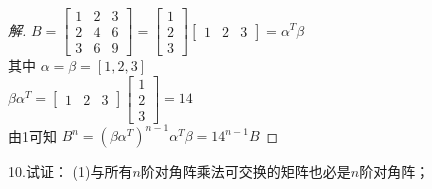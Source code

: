 \documentclass[10pt,a4paper]{report}
\begin{document}
\begin{proof}[解]
	$B = 
	\left[
	\begin{matrix}
	1 & 2 & 3 \\
	2 & 4 & 6 \\
	3 & 6 & 9
	\end{matrix}
	\right] = 
	\left[
	\begin{matrix}
	1 \\
	2 \\
	3 
	\end{matrix}
	\right]
	\left[
	\begin{matrix}
	1 & 2 & 3 
	\end{matrix}
	\right] = \alpha^{T} \beta
	$\\
	其中
	$
	\alpha = \beta = [1, 2, 3]
	$\\
	$
	\beta \alpha^{T} = 
	\left[
	\begin{matrix}
		1 & 2 & 3
	\end{matrix}
	\right]
	\left[
	\begin{matrix}
		1 \\
		2 \\
		3
	\end{matrix}
	\right] = 14
	$\\
	由1可知
	$
	B^{n} = (\beta\alpha^{T})^{n-1}\alpha^{T}\beta = 14^{n-1}B
	$
\end{proof}
\noindent 10.试证：
\noindent (1)与所有$n$阶对角阵乘法可交换的矩阵也必是$n$阶对角阵；
\end{document}
